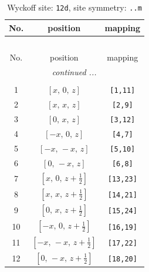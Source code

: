 \documentclass[fleqn,8pt]{jsarticle}
\begin{document}
\begin{longtable}{ccc}
\caption{Wyckoff site: {\tt 12d}, site symmetry: {\tt ..m}}
 \\
 \hline \hline
No. & position & mapping \\ \hline \endfirsthead

\multicolumn{2}{l}{\tablename\ \thetable{}} \\
 \hline \hline
No. & position & mapping \\ \hline \endhead

 \hline \hline
\multicolumn{2}{r}{\footnotesize\it continued ...} \\ \endfoot

 \hline \hline
\multicolumn{2}{r}{} \\ \endlastfoot

1 & $\left[ x,\, 0,\, z \right]$ & {\tt [1,11]} \\ \hline
2 & $\left[ x,\, x,\, z \right]$ & {\tt [2,9]} \\ \hline
3 & $\left[ 0,\, x,\, z \right]$ & {\tt [3,12]} \\ \hline
4 & $\left[ - x,\, 0,\, z \right]$ & {\tt [4,7]} \\ \hline
5 & $\left[ - x,\, - x,\, z \right]$ & {\tt [5,10]} \\ \hline
6 & $\left[ 0,\, - x,\, z \right]$ & {\tt [6,8]} \\ \hline
7 & $\left[ x,\, 0,\, z + \frac{1}{2} \right]$ & {\tt [13,23]} \\ \hline
8 & $\left[ x,\, x,\, z + \frac{1}{2} \right]$ & {\tt [14,21]} \\ \hline
9 & $\left[ 0,\, x,\, z + \frac{1}{2} \right]$ & {\tt [15,24]} \\ \hline
10 & $\left[ - x,\, 0,\, z + \frac{1}{2} \right]$ & {\tt [16,19]} \\ \hline
11 & $\left[ - x,\, - x,\, z + \frac{1}{2} \right]$ & {\tt [17,22]} \\ \hline
12 & $\left[ 0,\, - x,\, z + \frac{1}{2} \right]$ & {\tt [18,20]} \\
\end{longtable}
\renewcommand{\arraystretch}{1.2}
\end{document}
